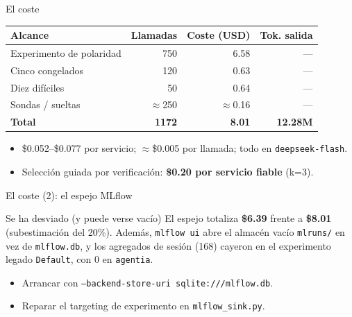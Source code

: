 \documentclass[aspectratio=169,11pt]{beamer}
\begin{document}
\begin{frame}{El coste}
  \begin{center}
    \begin{tabular}{lrrr}
      \toprule
      \textbf{Alcance} & \textbf{Llamadas} & \textbf{Coste (USD)} & \textbf{Tok. salida} \\
      \midrule
      Experimento de polaridad & 750 & 6.58 & --- \\
      Cinco congelados & 120 & 0.63 & --- \\
      Diez difíciles & 50 & 0.64 & --- \\
      Sondas / sueltas & $\approx$250 & $\approx$0.16 & --- \\
      \midrule
      \textbf{Total} & \textbf{1172} & \textbf{8.01} & \textbf{12.28M} \\
      \bottomrule
    \end{tabular}
  \end{center}
  \begin{itemize}
    \item \$0.052--\$0.077 por servicio; $\approx$\$0.005 por llamada; todo en \texttt{deepseek-flash}.
    \item Selección guiada por verificación: \textbf{\$0.20 por servicio fiable} (k=3).
  \end{itemize}
\end{frame}

\begin{frame}{El coste (2): el espejo MLflow}
  \begin{alertblock}{Se ha desviado (y puede verse vacío)}
    El espejo totaliza \textbf{\$6.39} frente a \textbf{\$8.01} (subestimación del 20\%).
    Además, \texttt{mlflow ui} abre el almacén vacío \texttt{mlruns/} en vez de
    \texttt{mlflow.db}, y los agregados de sesión (168) cayeron en el experimento
    legado \texttt{Default}, con 0 en \texttt{agentia}.
  \end{alertblock}
  \begin{itemize}
    \item Arrancar con \texttt{--backend-store-uri sqlite:///mlflow.db}.
    \item Reparar el targeting de experimento en \texttt{mlflow\_sink.py}.
  \end{itemize}
\end{frame}
\end{document}
